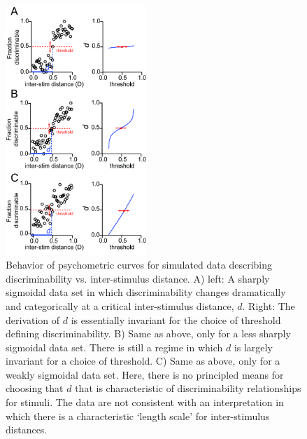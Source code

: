 \documentclass[letterpaper,twocolumn,10pt]{article}
\begin{document}
\begin{figure}
    \centering
    \includegraphics[width=0.475\textwidth]{figures/Fig5_Sigmoids}
    \caption{
Behavior of psychometric curves for simulated data describing discriminability vs. inter-stimulus distance. 
A) left: A sharply sigmoidal data set in which 
discriminability changes dramatically and categorically at a critical inter-stimulus distance, $d$. 
Right: The derivation of $d$ is essentially invariant for the choice of threshold defining discriminability. 
B) Same as above, only for a less sharply sigmoidal data set. 
There is still a regime in which $d$ is largely invariant for a choice of threshold. 
C) Same as above, only for a weakly sigmoidal data set. 
Here, there is no principled means for choosing that $d$ that is characteristic of discriminability relationships for stimuli. 
The data are not consistent with an interpretation in which 
there is a characteristic `length scale' for inter-stimulus distances.}
    \label{fig:sigmoids}
\end{figure}
\end{document}
